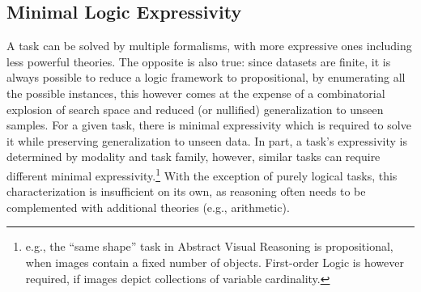 \subsection{Minimal Logic Expressivity}
A task can be solved by multiple formalisms, with more expressive ones including less powerful theories. The opposite is also true: since datasets are finite, it is always possible to reduce a logic framework to propositional, by enumerating all the possible instances, this however comes at the expense of a combinatorial explosion of search space and reduced (or nullified) generalization to unseen samples.
%
For a given task, there is minimal expressivity which is required to solve it while preserving generalization to unseen data.
%
%
%
In part, a task's expressivity is determined by modality and task family, however, similar tasks can require different minimal expressivity.\footnote{e.g., the ``same shape'' task in Abstract Visual Reasoning is propositional, when images contain a fixed number of objects. First-order Logic is however required, if images depict collections of variable cardinality.}
With the exception of purely logical tasks, this characterization is insufficient on its own, as reasoning often needs to be complemented with additional theories (e.g., arithmetic). %

